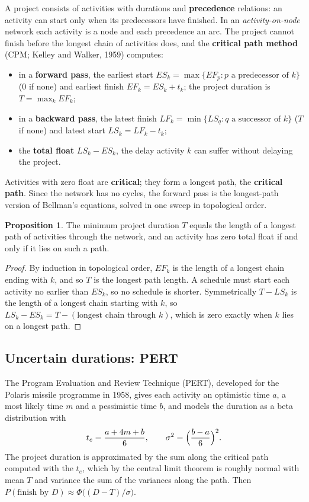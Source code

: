 \documentclass[11pt,a4paper]{article}
\numberwithin{equation}{section}
\theoremstyle{definition}
\newtheorem{prop}[thm]{Proposition}
\begin{document}
A project consists of activities with durations and \textbf{precedence} relations: an activity can start only when its predecessors have finished. In an \emph{activity-on-node} network each activity is a node and each precedence an arc. The project cannot finish before the longest chain of activities does, and the \textbf{critical path method}
(CPM; Kelley and Walker, 1959) computes:
\begin{itemize}
\item in a \textbf{forward pass}, the earliest start $ES_k = \max\{EF_p : p \text{ a predecessor of } k\}$ ($0$ if none) and earliest finish $EF_k = ES_k + t_k$; the project duration is $T = \max_kEF_k$;
\item in a \textbf{backward pass}, the latest finish $LF_k = \min\{LS_q : q \text{ a successor of } k\}$ ($T$ if none) and latest start $LS_k = LF_k - t_k$;
\item the \textbf{total float} $LS_k - ES_k$, the delay activity $k$ can suffer without delaying the project.
\end{itemize}
Activities with zero float are \textbf{critical}; they form a longest path, the \textbf{critical path}. Since the network has no cycles, the forward pass is the longest-path version of Bellman's equations, solved in one sweep in topological order.

\begin{prop}
\label{prop:cpm}
The minimum project duration $T$ equals the length of a longest path of activities through the network, and an activity has zero total float if and only if it lies on such a path.
\end{prop}

\begin{proof}
By induction in topological order, $EF_k$ is the length of a longest chain ending with $k$, and so $T$ is the longest path length. A schedule must start each activity no earlier than $ES_k$, so no schedule is shorter. Symmetrically $T - LS_k$ is the length of a longest chain starting with $k$, so $LS_k - ES_k = T - (\text{longest chain through } k)$, which is zero exactly
when $k$ lies on a longest path.
\end{proof}

\subsection{Uncertain durations: PERT}
\label{ssec:pert}

The Program Evaluation and Review Technique (PERT), developed for the Polaris missile programme in 1958, gives each activity an optimistic time $a$, a most likely time $m$ and a pessimistic time $b$, and models the duration as a beta distribution with
\[
t_e = \frac{a + 4m + b}6, \qquad \sigma^2 = \Bigl(\frac{b - a}6\Bigr)^2 .
\]
The project duration is approximated by the sum along the critical path computed with the $t_e$, which by the central limit theorem is roughly normal with mean $T$ and variance the sum of the variances along the path. Then $P(\text{finish by } D) \approx \Phi\bigl((D - T)/\sigma\bigr)$.
\end{document}

